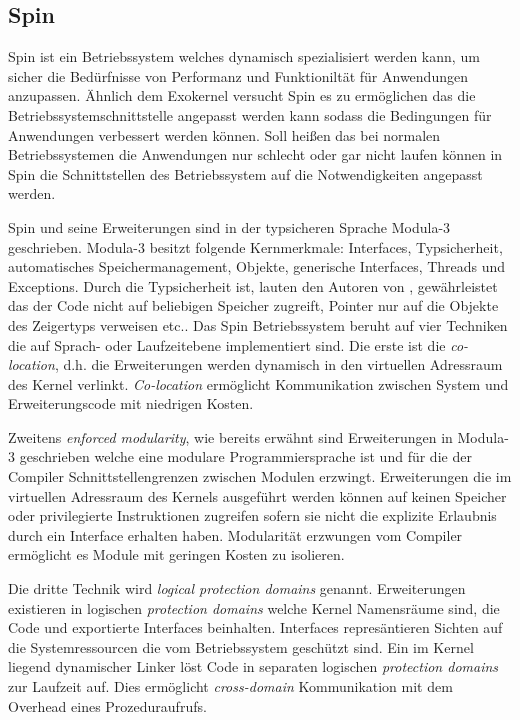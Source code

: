 \documentclass[german, 9pt,technote]{IEEEtran}
\begin{document}
        
    \subsection{Spin} \label{sec:other:spin}
      Spin ist ein Betriebssystem welches dynamisch spezialisiert werden kann, um sicher die Bed\"urfnisse von Performanz und Funktionilt\"at f\"ur
      Anwendungen anzupassen. \"Ahnlich dem Exokernel versucht Spin es zu erm\"oglichen das die Betriebssystemschnittstelle angepasst werden kann
      sodass die Bedingungen f\"ur Anwendungen verbessert werden k\"onnen. Soll hei\ss en das bei normalen Betriebssystemen die Anwendungen nur 
      schlecht oder gar nicht laufen k\"onnen in Spin die Schnittstellen des Betriebssystem auf die Notwendigkeiten angepasst werden.
      
      Spin und seine Erweiterungen sind in der typsicheren Sprache Modula-3 geschrieben. Modula-3 besitzt folgende Kernmerkmale: 
      Interfaces, Typsicherheit, automatisches Speichermanagement, Objekte, generische Interfaces, Threads und Exceptions.
      Durch die Typsicherheit ist, lauten den Autoren von \cite{inproc:spin}, gew\"ahrleistet das der Code nicht auf beliebigen Speicher zugreift,
      Pointer nur auf die Objekte des Zeigertyps verweisen etc..
      Das Spin Betriebssystem beruht auf vier Techniken die auf Sprach- oder Laufzeitebene implementiert sind.
      Die erste ist die \textit{co-location}, d.h. die Erweiterungen werden dynamisch in den virtuellen Adressraum des Kernel verlinkt.
      \textit{Co-location} erm\"oglicht Kommunikation zwischen System und Erweiterungscode mit niedrigen Kosten.
      
      Zweitens \textit{enforced modularity}, wie bereits erw\"ahnt sind Erweiterungen in Modula-3 geschrieben welche eine modulare
      Programmiersprache ist und f\"ur die der Compiler Schnittstellengrenzen zwischen Modulen erzwingt.
      Erweiterungen die im virtuellen Adressraum des Kernels ausgef\"uhrt werden k\"onnen auf keinen Speicher oder privilegierte Instruktionen 
      zugreifen sofern sie nicht die explizite Erlaubnis durch ein Interface erhalten haben.
      Modularit\"at erzwungen vom Compiler erm\"oglicht es Module mit geringen Kosten zu isolieren.
      
      Die dritte Technik wird \textit{logical protection domains} genannt. Erweiterungen existieren in logischen \textit{protection domains} welche Kernel
      Namensr\"aume sind, die Code und exportierte Interfaces beinhalten. Interfaces repres\"antieren Sichten auf die Systemressourcen
      die vom Betriebssystem gesch\"utzt sind. Ein im Kernel liegend dynamischer Linker l\"ost Code in separaten logischen 
      \textit{protection domains} zur Laufzeit auf. Dies erm\"oglicht \textit{cross-domain} Kommunikation mit dem Overhead eines Prozeduraufrufs.
      
\end{document}
